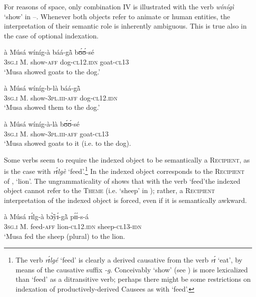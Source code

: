\documentclass[output=paper]{langsci/langscibook}
\begin{document}
For reasons of space, only combination IV is illustrated with the verb \textit{wínígì} `show' in --. Whenever both objects refer to animate or human entities, the interpretation of their semantic role is inherently ambiguous. This is true also in the case of optional indexation.

\ea
\label{ex:25.pacchiarotti}
\gll à    Músá  wíníg-à  báá-g\`{ã}    bʊ́ʊ́-sé \\
\textsc{3sg.i}    M.  show-\textsc{aff}  dog-\textsc{cl12.idn}  goat-\textsc{cl13}\\
\glt `Musa showed goats to the dog.'
\z

\ea
\label{ex:26.pacchiarotti}
\gll à    Músá  wíníg-b-là    báá-g\`{ã}\\
\textsc{3sg.i} M.  show-\textsc{3pl.iii-aff}  dog-\textsc{cl12.idn}\\
\glt `Musa showed them to the dog.'  
\z

\ea
\label{ex:27.pacchiarotti}
\gll à    Músá  wíníg-à-là    bʊ́ʊ́-sé\\
\textsc{3sg.i}    M.  show-\textsc{3pl.iii-aff}  goat-\textsc{cl13}\\
\glt `Musa showed goats to it (i.e. to the dog).
\z

Some verbs seem to require the indexed object to be semantically a \textsc{Recipient}, as is the case with \textit{rɪ́lgè} `feed'.\footnote{ The verb \textit{rɪ́lgé} `feed' is clearly a derived causative from the verb \textit{rɪ́} `eat', by means of the causative suffix \textit{-g}. Conceivably `show' (see ) is more lexicalized than `feed' as a ditransitive verb; perhaps there might be some restrictions on indexation of productively-derived Causees as with `feed'.} In  the indexed object corresponds to the \textsc{Recipient} of , `lion'. The ungrammaticality of  shows that with the verb `feed'the indexed object cannot refer to the \textsc{Theme} (i.e. `sheep' in ); rather, a \textsc{Recipient} interpretation of the indexed object is forced, even if it is semantically awkward.

\ea
\label{ex:28.pacchiarotti}
\gll à    Músá  rɪ́lg-à    bɔ̃̀yɪ́-g\`{ã}    pɪ́ɪ́-s-á\\
\textsc{3sg.i}    M.  feed-\textsc{aff}  lion-\textsc{cl12.idn}  sheep-\textsc{cl13-idn}\\
\glt `Musa fed the sheep (plural) to the lion.
\z
\end{document}
